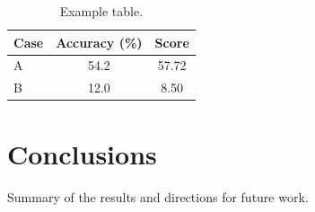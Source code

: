 \documentclass[
    bindingoffset=5mm,  %
    footnoteindent=3mm, %
    hyphenation=true    %
]{src/wut-thesis}
\begin{document}
	\begin{table}[htbp]
		\centering
		\caption{Example table.}
		\label{tab:example}
		\begin{tabular}{l S[table-format=2.1] S[table-format=2.2]}
			\toprule
			\textbf{Case} & {\textbf{Accuracy (\%)}} & {\textbf{Score}} \\
			\midrule
			A & 54.2 & 57.72 \\
			B & 12.0 & 8.50 \\
			\bottomrule
		\end{tabular}
	\end{table}

	\section{Conclusions}

	Summary of the results and directions for future work.

	\printbibliography
\end{document}
